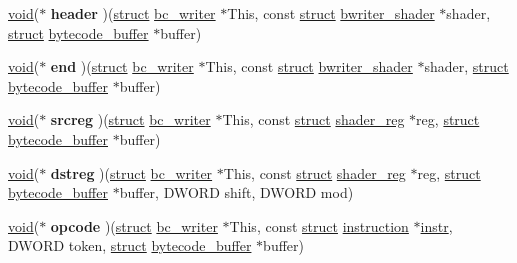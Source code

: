 \begin{DoxyCompactItemize}
\item 
\mbox{\label{structbytecode__backend_a1e2de4e652909e393bc3480c24743ace}} 
\hyperlink{interfacevoid}{void}($\ast$ {\bfseries header} )(\hyperlink{interfacestruct}{struct} \hyperlink{structbc__writer}{bc\+\_\+writer} $\ast$This, const \hyperlink{interfacestruct}{struct} \hyperlink{structbwriter__shader}{bwriter\+\_\+shader} $\ast$shader, \hyperlink{interfacestruct}{struct} \hyperlink{structbytecode__buffer}{bytecode\+\_\+buffer} $\ast$buffer)
\item 
\mbox{\label{structbytecode__backend_ae9cabac7930a44c6368007525c4d2b32}} 
\hyperlink{interfacevoid}{void}($\ast$ {\bfseries end} )(\hyperlink{interfacestruct}{struct} \hyperlink{structbc__writer}{bc\+\_\+writer} $\ast$This, const \hyperlink{interfacestruct}{struct} \hyperlink{structbwriter__shader}{bwriter\+\_\+shader} $\ast$shader, \hyperlink{interfacestruct}{struct} \hyperlink{structbytecode__buffer}{bytecode\+\_\+buffer} $\ast$buffer)
\item 
\mbox{\label{structbytecode__backend_ac390bcc6bc534c5e9fa67e7aab512a05}} 
\hyperlink{interfacevoid}{void}($\ast$ {\bfseries srcreg} )(\hyperlink{interfacestruct}{struct} \hyperlink{structbc__writer}{bc\+\_\+writer} $\ast$This, const \hyperlink{interfacestruct}{struct} \hyperlink{structshader__reg}{shader\+\_\+reg} $\ast$reg, \hyperlink{interfacestruct}{struct} \hyperlink{structbytecode__buffer}{bytecode\+\_\+buffer} $\ast$buffer)
\item 
\mbox{\label{structbytecode__backend_a32f438c332649713058b053914a45cc9}} 
\hyperlink{interfacevoid}{void}($\ast$ {\bfseries dstreg} )(\hyperlink{interfacestruct}{struct} \hyperlink{structbc__writer}{bc\+\_\+writer} $\ast$This, const \hyperlink{interfacestruct}{struct} \hyperlink{structshader__reg}{shader\+\_\+reg} $\ast$reg, \hyperlink{interfacestruct}{struct} \hyperlink{structbytecode__buffer}{bytecode\+\_\+buffer} $\ast$buffer, D\+W\+O\+RD shift, D\+W\+O\+RD mod)
\item 
\mbox{\label{structbytecode__backend_aadbbb98774c376ccd2dbf370b3ff69b9}} 
\hyperlink{interfacevoid}{void}($\ast$ {\bfseries opcode} )(\hyperlink{interfacestruct}{struct} \hyperlink{structbc__writer}{bc\+\_\+writer} $\ast$This, const \hyperlink{interfacestruct}{struct} \hyperlink{structinstruction}{instruction} $\ast$\hyperlink{structx86__inst}{instr}, D\+W\+O\+RD token, \hyperlink{interfacestruct}{struct} \hyperlink{structbytecode__buffer}{bytecode\+\_\+buffer} $\ast$buffer)

\end{DoxyCompactItemize}
